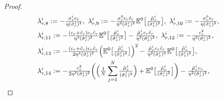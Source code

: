 \documentclass[10pt,a4paper]{amsart}
\begin{document}
\begin{proof}
\begin{align}
&\lambda_{r,8}^{i} := -\tfrac{\sigma_{r}^{i}c_{r}}{\eta(\bar{\sigma}_{r}^{i})^{2}}, \  
\lambda_{r,9}^{i} := -\tfrac{\sigma_{r}^{0}c_{r}\tilde{c}_{r}}{\eta^{2}(\bar{\sigma}_{r}^{i})^{2}}\mathbb{E}^{0}\bigl[\tfrac{\tilde{\mu}_{r}^{i}}{(\bar{\sigma}_{r}^{i})^{2}}\bigr], \ 
\lambda_{r,10}^{i} := -\tfrac{\sigma_{r}^{0}c_{r}}{\eta(\bar{\sigma}_{r}^{i})^{2}}, 
\label{equ:def_lambda8} \\
&\lambda_{r,11}^{i} := -\tfrac{(c_{r}+\tilde{c}_{r})c_{r}\tilde{c}_{r}}{\eta^{3}(\bar{\sigma}_{r}^{i})^{2}}\mathbb{E}^{0}\bigl[\tfrac{\tilde{\mu}_{r}^{i}}{(\bar{\sigma}_{r}^{i})^{2}}\bigr] - \tfrac{\tilde{\mu}_{r}^{i}c_{r}\tilde{c}_{r}}{\eta^{2}(\bar{\sigma}_{r}^{i})^{2}}, \ 
\lambda_{r,12}^{i} := -\tfrac{c_{r}^{2}}{\eta^{2}(\bar{\sigma}_{r}^{i})^{2}},
\label{equ:def_lambda11} \\
&\lambda_{r,13}^{i} := -\tfrac{(c_{r}+\tilde{c}_{r})c_{r}\tilde{c}_{r}}{2\eta^{4}(\bar{\sigma}_{r}^{i})^{2}}\Bigl(\mathbb{E}^{0}\bigl[\tfrac{\tilde{\mu}_{r}^{i}}{(\bar{\sigma}_{r}^{i})^{2}}\bigr]\Bigr)^{2} - \tfrac{\tilde{\mu}_{r}^{i}c_{r}\tilde{c}_{r}}{\eta^{3}(\bar{\sigma}_{r}^{i})^{2}}\mathbb{E}^{0}\bigl[\tfrac{\tilde{\mu}_{r}^{i}}{(\bar{\sigma}_{r}^{i})^{2}}\bigr], \label{equ:def_lambda13} \\
&\lambda_{r,14}^{i} := -\tfrac{c_{r}^{2}}{2\eta^{3}(\bar{\sigma}_{r}^{i})^{2}}\biggl(\Bigl(\tfrac{1}{N}\sum_{j=1}^{N}\tfrac{\tilde{\mu}_{r}^{j}}{(\bar{\sigma}_{r}^{j})^{2}}\Bigr)+\mathbb{E}^{0}\bigl[\tfrac{\tilde{\mu}_{r}^{i}}{(\bar{\sigma}_{r}^{i})^{2}}\bigr]\biggr) - \tfrac{\tilde{\mu}_{r}^{i}c_{r}}{\eta^{2}(\bar{\sigma}_{r}^{i})^{2}},

\end{align}
\end{proof}
\end{document}
